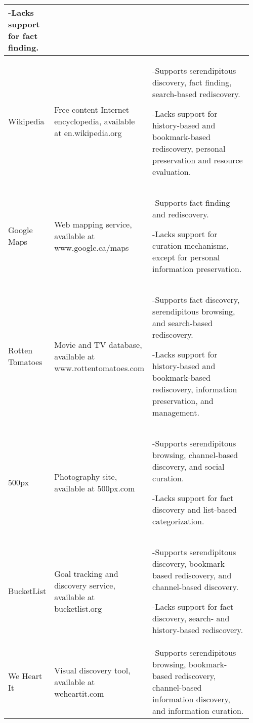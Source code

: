 \begin{longtable}{|p{0.16\linewidth}| p{0.30\linewidth}| p{0.50\linewidth}|}
-\hspace{0.4cm}Lacks support for fact finding.                                                                       \\
\hline
Wikipedia       & \raggedright Free content Internet encyclopedia, available at en.wikipedia.org             & -\hspace{0.4cm}Supports serendipitous discovery, fact finding, search-based rediscovery.

-\hspace{0.4cm}Lacks support for history-based and bookmark-based rediscovery, personal preservation and resource evaluation. \\
\hline
Google Maps     & \raggedright Web mapping service, available at www.google.ca/maps                         & 
-\hspace{0.4cm}Supports fact finding and rediscovery. 

-\hspace{0.4cm}Lacks support for curation mechanisms, except for personal information preservation. 
\\
\hline
Rotten Tomatoes & \raggedright Movie and TV database, available at www.rottentomatoes.com                   & -\hspace{0.4cm}Supports fact discovery, serendipitous browsing, and search-based rediscovery. 

-\hspace{0.4cm}Lacks support for history-based and bookmark-based rediscovery, information preservation, and management. \\
\hline
500px           & \raggedright Photography site, available at 500px.com            & 
-\hspace{0.4cm}Supports serendipitous browsing, channel-based discovery, and social curation. 

-\hspace{0.4cm}Lacks support for fact discovery and list-based categorization. \\
\hline
BucketList      & \raggedright Goal tracking and discovery service, available at bucketlist.org             & -\hspace{0.4cm}Supports serendipitous discovery, bookmark-based rediscovery, and channel-based discovery. 

-\hspace{0.4cm}Lacks support for fact discovery, search- and history-based rediscovery. \\
\hline
We Heart It     & \raggedright Visual discovery tool, available at weheartit.com                            & -\hspace{0.4cm}Supports serendipitous browsing, bookmark-based rediscovery, channel-based information discovery, and information curation.


\end{longtable}
